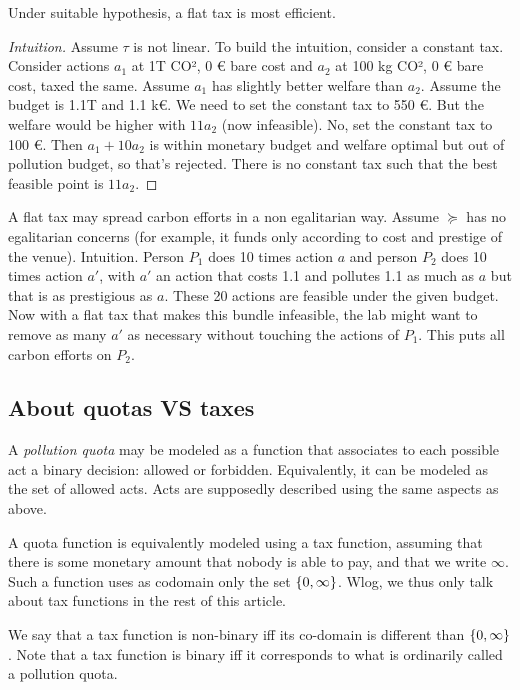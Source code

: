 \documentclass[version=3.21, pagesize, twoside=off, bibliography=totoc, DIV=calc, fontsize=12pt, a4paper, french, english]{scrartcl}
\begin{document}
\begin{theorem}
	Under suitable hypothesis, a flat tax is most efficient.
\end{theorem}
\begin{proof}[Intuition]
	Assume $\tau$ is not linear. To build the intuition, consider a constant tax. Consider actions $a_1$ at 1T CO², 0 € bare cost and $a_2$ at 100 kg CO², 0 € bare cost, taxed the same. Assume $a_1$ has slightly better welfare than $a_2$.
	Assume the budget is 1.1T and 1.1 k€. We need to set the constant tax to 550 €. But the welfare would be higher with $11 a_2$ (now infeasible). No, set the constant tax to 100 €. Then $a_1 + 10 a_2$ is within monetary budget and welfare optimal but out of pollution budget, so that’s rejected. There is no constant tax such that the best feasible point is $11 a_2$.
\end{proof}
		
A flat tax may spread carbon efforts in a non egalitarian way. Assume $\succeq$ has no egalitarian concerns (for example, it funds only according to cost and prestige of the venue).
Intuition. Person $P_1$ does 10 times action $a$ and person $P_2$ does 10 times action $a'$, with $a'$ an action that costs 1.1 and pollutes 1.1 as much as $a$ but that is as prestigious as $a$. These 20 actions are feasible under the given budget. Now with a flat tax that makes this bundle infeasible, the lab might want to remove as many $a'$ as necessary without touching the actions of $P_1$. This puts all carbon efforts on $P_2$.

\subsection{About quotas VS taxes}
A \emph{pollution quota} may be modeled as a function that associates to each possible act a binary decision: allowed or forbidden. Equivalently, it can be modeled as the set of allowed acts. Acts are supposedly described using the same aspects as above.

A quota function is equivalently modeled using a tax function, assuming that there is some monetary amount that nobody is able to pay, and that we write $\infty$. Such a function uses as codomain only the set $\{0, \infty\}$. Wlog, we thus only talk about tax functions in the rest of this article.

We say that a tax function is non-binary iff its co-domain is different than $\{0, \infty\}$. Note that a tax function is binary iff it corresponds to what is ordinarily called a pollution quota.
\end{document}
